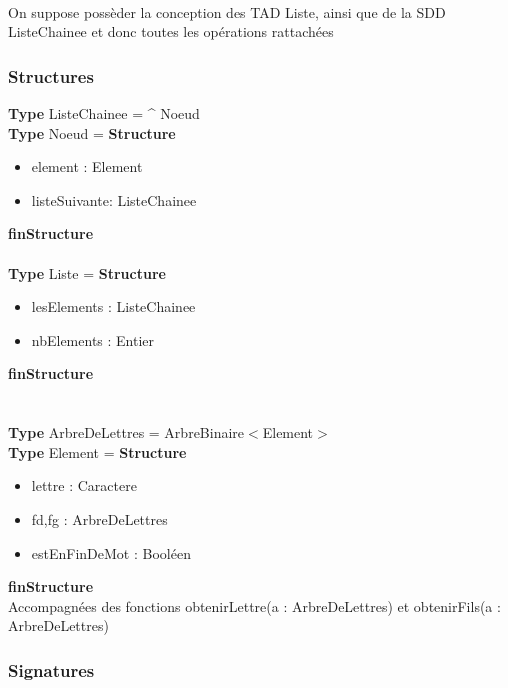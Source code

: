 \documentclass{article}
\begin{document}
    \pagestyle{empty}
    \noindent
    \\
    On suppose possèder la conception des TAD Liste, ainsi que de la SDD ListeChainee et donc toutes les opérations rattachées
    \\
    \subsubsection*{Structures}
    \textbf{Type} ListeChainee = \^ \- Noeud \\
    \textbf{Type} Noeud = \textbf{Structure}
	\begin{itemize}[label=$\ $, leftmargin=2cm]
		 \item element : Element
		 \item listeSuivante: ListeChainee
	\end{itemize}
    \textbf{finStructure}
    \\
    \\
    \textbf{Type} Liste = \textbf{Structure}
	\begin{itemize}[label=$\ $, leftmargin=2cm]
		 \item lesElements : ListeChainee
		 \item nbElements : Entier
    \end{itemize}
    \textbf{finStructure} \\
    \\
    \\
    \textbf{Type} ArbreDeLettres = ArbreBinaire$<$Element$>$ \\
    \textbf{Type} Element = \textbf{Structure}
	\begin{itemize}[label=$\ $, leftmargin=2cm]
		 \item lettre : Caractere
		 \item fd,fg : ArbreDeLettres
		 \item estEnFinDeMot : Booléen
	\end{itemize}
    \textbf{finStructure}\\
    Accompagnées des fonctions obtenirLettre(a : ArbreDeLettres) et obtenirFils(a : ArbreDeLettres)
    
    
    \subsubsection*{Signatures}
\end{document}
